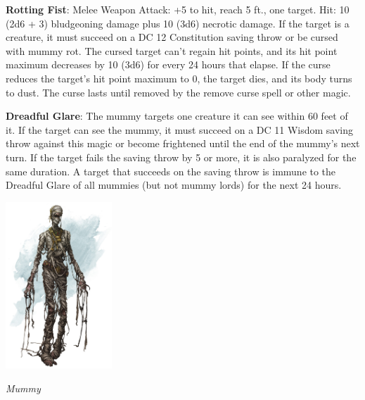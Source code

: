 \noindent\textbf{Rotting Fist}: Melee Weapon Attack: +5 to hit, reach 5 ft., one target. Hit: 10 (2d6 + 3) bludgeoning damage plus 10 (3d6) necrotic damage. If the target is a creature, it must succeed on a DC 12 Constitution saving throw or be cursed with mummy rot. The cursed target can't regain hit points, and its hit point maximum decreases by 10 (3d6) for every 24 hours that elapse. If the curse reduces the target's hit point maximum to 0, the target dies, and its body turns to dust. The curse lasts until removed by the remove curse spell or other magic.

\noindent\textbf{Dreadful Glare}: The mummy targets one creature it can see within 60 feet of it. If the target can see the mummy, it must succeed on a DC 11 Wisdom saving throw against this magic or become frightened until the end of the mummy's next turn. If the target fails the saving throw by 5 or more, it is also paralyzed for the same duration. A target that succeeds on the saving throw is immune to the Dreadful Glare of all mummies (but not mummy lords) for the next 24 hours.

\begin{center}
	\includegraphics[width = 0.3\textwidth]{mummy}
	
	\emph{Mummy}
\end{center}